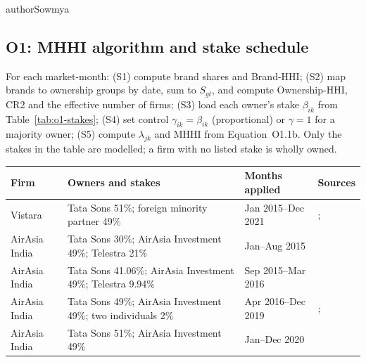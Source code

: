 \begin{mergedcontribution}{authorSowmya}
\subsection{O1: MHHI algorithm and stake schedule}
\label{app:o1-stakes}
For each market-month: (S1) compute brand shares and Brand-HHI; (S2) map brands to ownership groups by date, sum to $S_{gt}$, and compute Ownership-HHI, CR2 and the effective number of firms; (S3) load each owner's stake $\beta_{ik}$ from Table~\ref{tab:o1-stakes}; (S4) set control $\gamma_{ik}=\beta_{ik}$ (proportional) or $\gamma=1$ for a majority owner; (S5) compute $\lambda_{jk}$ and MHHI from Equation~O1.1b. Only the stakes in the table are modelled; a firm with no listed stake is wholly owned.

\begin{minipage}{\linewidth}
\label{tab:o1-stakes}
\centering
{\footnotesize{}\setlength{\tabcolsep}{4pt}
\fontsize{10}{12}\selectfont{}\setlength{\tabcolsep}{3pt}
\renewcommand{\arraystretch}{1.15}
\begin{tabular}{|>{\raggedright\arraybackslash}p{}|>{\raggedright\arraybackslash}p{}|>{\raggedright\arraybackslash}p{}|>{\raggedright\arraybackslash}p{}|}
\hline
\textbf{Firm} & \textbf{Owners and stakes} & \textbf{Months applied} & \textbf{Sources} \\
\hline
Vistara & Tata Sons 51\%; foreign minority partner 49\% & Jan 2015--Dec 2021 & \textcite{sia2015annual}; \textcite{sia2022merger} \\
\hline
AirAsia India & Tata Sons 30\%; AirAsia Investment 49\%; Telestra 21\% & Jan--Aug 2015 & \textcite{airasia2013jv} \\
\hline
AirAsia India & Tata Sons 41.06\%; AirAsia Investment 49\%; Telestra 9.94\% & Sep 2015--Mar 2016 & \textcite{tata2016airasia} \\
\hline
AirAsia India & Tata Sons 49\%; AirAsia Investment 49\%; two individuals 2\% & Apr 2016--Dec 2019 & \textcite{tata2016airasia}; \textcite{airasia2018q4} \\
\hline
AirAsia India & Tata Sons 51\%; AirAsia Investment 49\% & Jan--Dec 2020 & \textcite{airasia2021disposal} \\

\end{tabular}}
\end{minipage}
\end{mergedcontribution}
